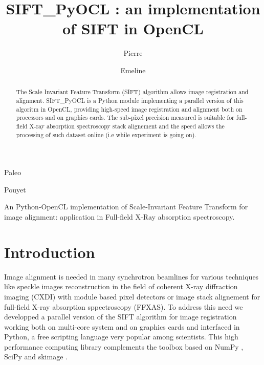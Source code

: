 \documentclass[preprint]{iucr}
\begin{document}
\title{SIFT\_PyOCL : an implementation of SIFT in OpenCL}

    \author[a]{Pierre}{Paleo}
    \author[a]{Emeline}{Pouyet}

\maketitle

\begin{synopsis}
An Python-OpenCL implementation of Scale-Invariant Feature Transform for image
alignment: application in Full-field X-Ray absorption spectroscopy.
\end{synopsis}

\begin{abstract}
The Scale Invariant Feature Transform (SIFT) algorithm allows image registration
and alignment. 
SIFT\_PyOCL is a Python module implementing a parallel version of this algoritm
in OpenCL,  providing high-speed image registration and alignment both on
processors and on graphics cards. 
The sub-pixel precision measured is suitable for full-field X-ray 
absorption spectroscopy stack alignement and the speed allows the processing of
such dataset online (i.e while experiment is going on).

\end{abstract}

\section{Introduction}

Image alignment is needed in many synchrotron beamlines for
various techniques like speckle images reconstruction in the field of coherent
X-ray diffraction imaging (CXDI) with module based pixel detectors or image
stack alignement for full-field X-ray absorption sppectroscopy (FFXAS).
To address this need we developped a parallel
version of the SIFT algorithm for image registration working both on multi-core
system and on graphics cards and interfaced in Python, a free scripting language
very popular among scientists. This high performance computing library complements
the toolbox based on NumPy \cite{numpy}, SciPy \cite{scipy} and
skimage \cite{skimage}.
\end{document}
